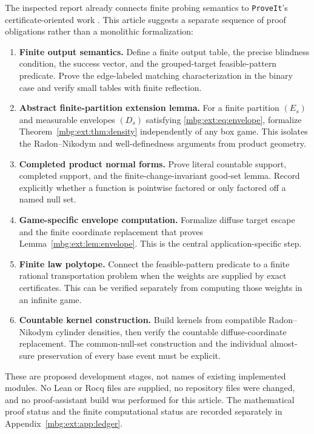 \documentclass[11pt,letterpaper]{article}
\theoremstyle{definition}
\newcommand{\repo}{\texttt{ProveIt}}
\begin{document}
The inspected report already connects finite probing semantics to \repo's certificate-oriented work \cite{ext:RepoReport}. This article suggests a separate sequence of proof obligations rather than a monolithic formalization:
\begin{enumerate}[label=\textbf{\arabic*.}]
\item \textbf{Finite output semantics.} Define a finite output table, the precise blindness condition, the success vector, and the grouped-target feasible-pattern predicate. Prove the edge-labeled matching characterization in the binary case and verify small tables with finite reflection.
\item \textbf{Abstract finite-partition extension lemma.} For a finite partition $(E_s)$ and measurable envelopes $(D_s)$ satisfying \eqref{mbg:ext:eq:envelope}, formalize Theorem~\ref{mbg:ext:thm:density} independently of any box game. This isolates the Radon--Nikodym and well-definedness arguments from product geometry.
\item \textbf{Completed product normal forms.} Prove literal countable support, completed support, and the finite-change-invariant good-set lemma. Record explicitly whether a function is pointwise factored or only factored off a named null set.
\item \textbf{Game-specific envelope computation.} Formalize diffuse target escape and the finite coordinate replacement that proves Lemma~\ref{mbg:ext:lem:envelope}. This is the central application-specific step.
\item \textbf{Finite law polytope.} Connect the feasible-pattern predicate to a finite rational transportation problem when the weights are supplied by exact certificates. This can be verified separately from computing those weights in an infinite game.
\item \textbf{Countable kernel construction.} Build kernels from compatible Radon--Nikodym cylinder densities, then verify the countable diffuse-coordinate replacement. The common-null-set construction and the individual almost-sure preservation of every base event must be explicit.
\end{enumerate}

These are proposed development stages, not names of existing implemented modules. No Lean or Rocq files are supplied, no repository files were changed, and no proof-assistant build was performed for this article. The mathematical proof status and the finite computational status are recorded separately in Appendix~\ref{mbg:ext:app:ledger}.
\end{document}
